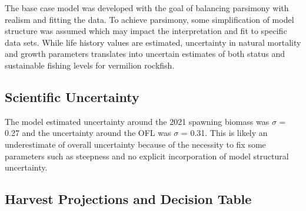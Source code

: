 \documentclass[11pt,
  english,
  a4paper,
]{article}
\begin{document}
\leavevmode\tagmcend\tagstructend


The base case model was developed with the goal of balancing parsimony with realism and fitting the data. To achieve parsimony, some simplification of model structure was assumed which may impact the interpretation and fit to specific data sets. While life history values are estimated, uncertainty in natural mortality and growth parameters translates into uncertain estimates of both status and sustainable fishing levels for vermilion rockfish.

\leavevmode\tagmcend\tagstructend\par


\hypertarget{scientific-uncertainty}{%
\subsection*{Scientific Uncertainty}\label{scientific-uncertainty}}

\leavevmode\tagmcend\tagstructend


The model estimated uncertainty around the 2021 spawning biomass was {\(\sigma\)\leavevmode\tagmcend\tagstructend} = 0.27 and the uncertainty around the OFL was {\(\sigma\)\leavevmode\tagmcend\tagstructend} = 0.31. This is likely an underestimate of overall uncertainty because of the necessity to fix some parameters such as steepness and no explicit incorporation of model structural uncertainty.

\leavevmode\tagmcend\tagstructend\par


\hypertarget{harvest-projections-and-decision-table}{%
\subsection*{Harvest Projections and Decision Table}\label{harvest-projections-and-decision-table}}

\leavevmode\tagmcend\tagstructend
\end{document}
